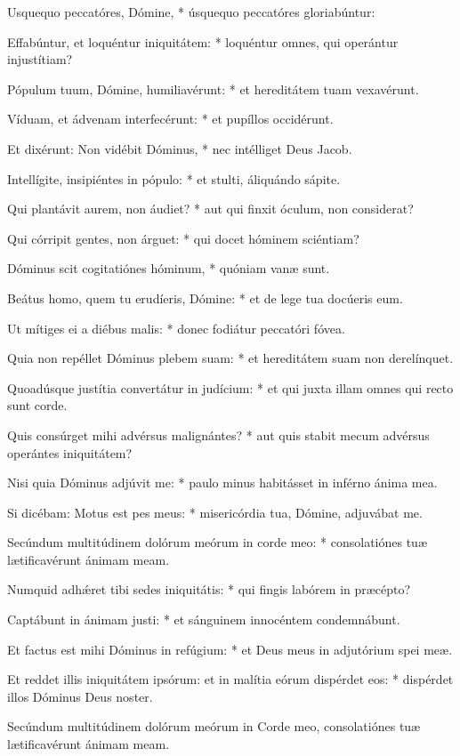 Usquequo peccatóres, Dómine, * úsquequo peccatóres gloriabúntur:

Effabúntur, et loquéntur iniquitátem: * loquéntur omnes, qui operántur injustítiam?

Pópulum tuum, Dómine, humiliavérunt: * et hereditátem tuam vexavérunt.

Víduam, et ádvenam interfecérunt: * et pupíllos occidérunt.

Et dixérunt: Non vidébit Dóminus, * nec intélliget Deus Jacob.

Intellígite, insipiéntes in pópulo: * et stulti, áliquándo sápite.

Qui plantávit aurem, non áudiet? * aut qui finxit óculum, non considerat?

Qui córripit gentes, non árguet: * qui docet hóminem sciéntiam?

Dóminus scit cogitatiónes hóminum, * quóniam vanæ sunt.

Beátus homo, quem tu erudíeris, Dómine: * et de lege tua docúeris eum.

Ut mítiges ei a diébus malis: * donec fodiátur peccatóri fóvea.

Quia non repéllet Dóminus plebem suam: * et hereditátem suam non derelínquet.

Quoadúsque justítia convertátur in judícium: * et qui juxta illam omnes qui recto sunt corde.

Quis consúrget mihi advérsus malignántes? * aut quis stabit mecum advérsus operántes iniquitátem?

Nisi quia Dóminus adjúvit me: * paulo minus habitásset in inférno ánima mea.

Si dicébam: Motus est pes meus: * misericórdia tua, Dómine, adjuvábat me.

Secúndum multitúdinem dolórum meórum in corde meo: * consolatiónes tuæ lætificavérunt ánimam meam.

Numquid adhǽret tibi sedes iniquitátis: * qui fingis labórem in præcépto?

Captábunt in ánimam justi: * et sánguinem innocéntem condemnábunt.

Et factus est mihi Dóminus in refúgium: * et Deus meus in adjutórium spei meæ.

Et reddet illis iniquitátem ipsórum: et in malítia eórum dispérdet eos: * dispérdet illos Dóminus Deus noster.

 Secúndum multitúdinem dolórum meórum in Corde meo, consolatiónes tuæ lætificavérunt ánimam meam.

